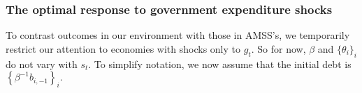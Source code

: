 \documentclass[thmsb,11pt]{article}
\begin{document}
% 
%
\subsubsection{The optimal response to government expenditure shocks}\label{sec: quasi linear interior }

\smallskip To contrast outcomes in our environment with those in AMSS's, we
temporarily restrict our attention to economies with  shocks only  to $g_{t}$. So for now, $\beta$ and $\{\theta_i\}_i$ do not vary with $s_t$.
To simplify notation, we now assume that the initial debt is $%
\left\{ \beta ^{-1}b_{i,-1}\right\} _{i}.$
%
\end{document}
